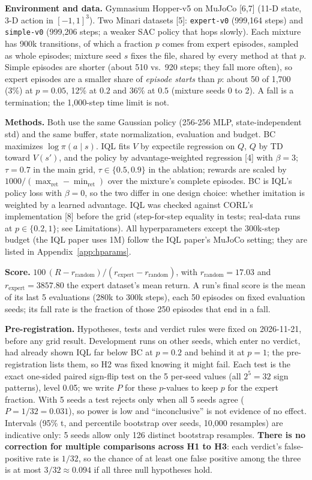 \documentclass{article}
\begin{document}
\textbf{Environment and data.} Gymnasium Hopper-v5 on MuJoCo [6,7] (11-D state, 3-D action in $[-1,1]^3$). Two Minari datasets [5]: \texttt{expert-v0} (999,164 steps) and \texttt{simple-v0} (999,206 steps; a weaker SAC policy that hops slowly). Each mixture has 900k transitions, of which a fraction $p$ comes from expert episodes, sampled as whole episodes; mixture seed $s$ fixes the file, shared by every method at that $p$. Simple episodes are shorter (about 510 vs.\ 920 steps; they fall more often), so expert episodes are a smaller share of \emph{episode starts} than $p$: about 50 of 1,700 (3\%) at $p=0.05$, 12\% at $0.2$ and 36\% at $0.5$ (mixture seeds 0 to 2). A fall is a termination; the 1,000-step time limit is not.

\textbf{Methods.} Both use the same Gaussian policy (256-256 MLP, state-independent std) and the same buffer, state normalization, evaluation and budget. BC maximizes $\log\pi(a\mid s)$. IQL fits $V$ by expectile regression on $Q$, $Q$ by TD toward $V(s')$, and the policy by advantage-weighted regression [4] with $\beta=3$; $\tau=0.7$ in the main grid, $\tau\in\{0.5,0.9\}$ in the ablation; rewards are scaled by $1000/(\max_\text{ret}-\min_\text{ret})$ over the mixture's complete episodes. BC is IQL's policy loss with $\beta=0$, so the two differ in one design choice: whether imitation is weighted by a learned advantage. IQL was checked against CORL's implementation [8] before the grid (step-for-step equality in tests; real-data runs at $p\in\{0.2,1\}$; see Limitations). All hyperparameters except the 300k-step budget (the IQL paper uses 1M) follow the IQL paper's MuJoCo setting; they are listed in Appendix~\ref{app:hparams}.

\textbf{Score.} $100\,(R-r_\text{random})/(r_\text{expert}-r_\text{random})$, with $r_\text{random}=17.03$ and $r_\text{expert}=3857.80$ the expert dataset's mean return. A run's final score is the mean of its last 5 evaluations (280k to 300k steps), each 50 episodes on fixed evaluation seeds; its fall rate is the fraction of those 250 episodes that end in a fall.

\textbf{Pre-registration.} Hypotheses, tests and verdict rules were fixed on 2026-11-21, before any grid result. Development runs on other seeds, which enter no verdict, had already shown IQL far below BC at $p=0.2$ and behind it at $p=1$; the pre-registration lists them, so H2 was fixed knowing it might fail. Each test is the exact one-sided paired sign-flip test on the 5 per-seed values (all $2^5=32$ sign patterns), level 0.05; we write $P$ for these $p$-values to keep $p$ for the expert fraction. With 5 seeds a test rejects only when all 5 seeds agree ($P=1/32=0.031$), so power is low and ``inconclusive'' is not evidence of no effect. Intervals (95\% t, and percentile bootstrap over seeds, 10,000 resamples) are indicative only: 5 seeds allow only 126 distinct bootstrap resamples. \textbf{There is no correction for multiple comparisons across H1 to H3}: each verdict's false-positive rate is $1/32$, so the chance of at least one false positive among the three is at most $3/32\approx0.094$ if all three null hypotheses hold.
\end{document}
